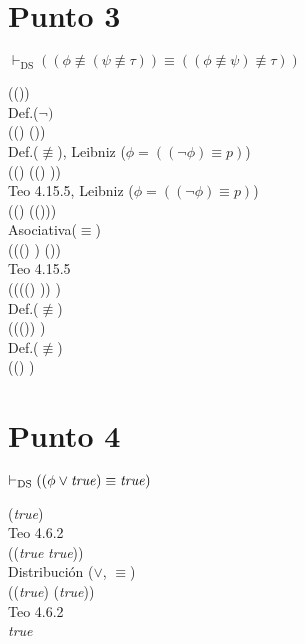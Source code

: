 \documentclass{article}
\begin{document}
\section{Punto 3}
\begin{logicenv}{$\vdash_{\text{DS}} ((\phi \not\equiv (\psi \not\equiv \tau)) \equiv ((\phi \not\equiv \psi) \not\equiv \tau))$}
    \begin{derivation}
            (\phi \not\equiv (\psi \not\equiv \tau))\\
            Def.($\neg)$\\
            ((\neg \phi) \equiv (\psi \not\equiv \tau))\\
            Def.($\not\equiv$), Leibniz ($\phi = ((\neg \phi) \equiv p)$)\\
            ((\neg \phi) \equiv ((\neg \psi) \equiv \tau))\\
            Teo 4.15.5, Leibniz ($\phi = ((\neg \phi) \equiv p)$)\\
            ((\neg \phi) \equiv (\psi \equiv (\neg \tau)))\\
            Asociativa($\equiv$)\\
            (((\neg \phi) \equiv \psi) \equiv (\neg \tau))\\
            Teo 4.15.5\\
            ((\neg ((\neg \phi) \equiv \psi)) \equiv \tau)\\
            Def.($\not\equiv$)\\
            ((\neg (\phi \not\equiv \psi)) \equiv \tau)\\
            Def.($\not\equiv$)\\
            ((\phi \not\equiv \psi) \not\equiv \tau)
    \end{derivation}
\end{logicenv}

\section{Punto 4}
\begin{logicenv}{$\vdash_{\text{DS}} ((\phi \lor \textrm{\textit{true}}) \equiv \textrm{\textit{true}})$}
    \begin{derivation}
        (\phi \lor \textrm{\textit{true}})\\
        Teo 4.6.2\\
        (\phi \lor (\textrm{\textit{true}} \equiv \textrm{\textit{true}}))\\
        Distribución ($\lor$, $\equiv$)\\
        ((\phi \lor \textrm{\textit{true}}) \equiv (\phi \lor \textrm{\textit{true}}))\\
        Teo 4.6.2\\
        \textrm{\textit{true}}
    \end{derivation}
\end{logicenv}
\end{document}
